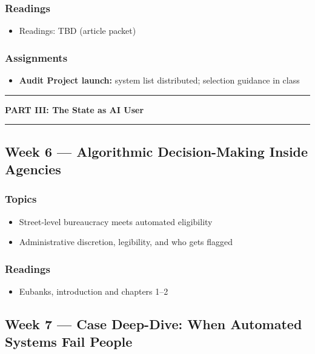 \documentclass[12pt]{article}
\begin{document}
    \subsubsection*{Readings}
        \begin{itemize}
            \item Readings: TBD (article packet)
        \end{itemize}
    \subsubsection*{Assignments}
        \begin{itemize}
            \item \textbf{Audit Project launch:} system list distributed; selection guidance in class
        \end{itemize}

\bigskip
\noindent\rule{\textwidth}{0.6pt}
\begin{center}\textbf{PART III: The State as AI User}\end{center}
\noindent\rule{\textwidth}{0.6pt}

\subsection*{Week 6 --- Algorithmic Decision-Making Inside Agencies}
    \subsubsection*{Topics}
        \begin{itemize}
            \item Street-level bureaucracy meets automated eligibility
            \item Administrative discretion, legibility, and who gets flagged
        \end{itemize}
    \subsubsection*{Readings}
        \begin{itemize}
            \item Eubanks, introduction and chapters 1--2
        \end{itemize}

\subsection*{Week 7 --- Case Deep-Dive: When Automated Systems Fail People}
\end{document}
